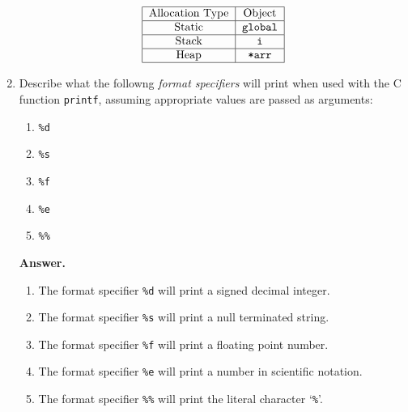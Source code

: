 \documentclass[9pt]{article}
\begin{document}
\begin{enumerate}
      $$
         \begin{tabular}{@{}|c|c|@{}} \hline
            Allocation Type & Object \\ \hline
            Static & \verb|global| \\ \hline
            Stack  & \verb|i| \\ \hline
            Heap   & \verb|*arr| \\ \hline
         \end{tabular}
      $$
   \item Describe what the followng \textit{format specifiers} will print when
         used with the C function \verb|printf|, assuming appropriate values are
         passed as arguments:
         \begin{enumerate}
            \item \verb|%d|
            \item \verb|%s|
            \item \verb|%f|
            \item \verb|%e|
            \item \verb|%%|
         \end{enumerate}

      \textbf{Answer.}

      \begin{enumerate}
         \item The format specifier \verb|%d| will print a signed decimal
               integer.
         \item The format specifier \verb|%s| will print a null terminated
               string.
         \item The format specifier \verb|%f| will print a floating point
               number.
         \item The format specifier \verb|%e| will print a number in scientific
               notation.
         \item The format specifier \verb|%%| will print the literal character
               `\verb|%|'.
      \end{enumerate}
\end{enumerate}
\end{document}
